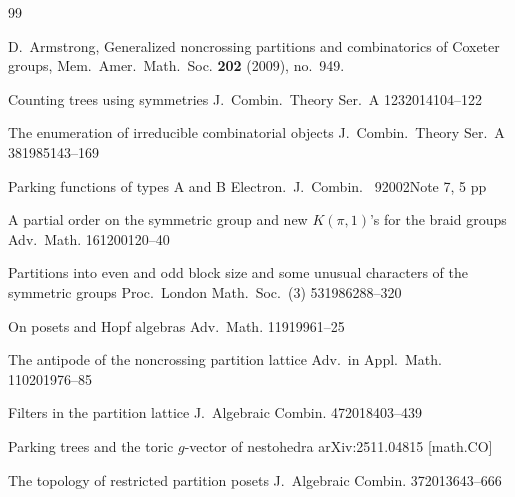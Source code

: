 \documentclass[11pt]{amsart}
\numberwithin{equation}{section}
\begin{document}
\begin{thebibliography}{99}

{\sc D.\ Armstrong,}
{Generalized noncrossing partitions and combinatorics of Coxeter groups,}
Mem.\ Amer.\ Math.\ Soc.
{\bf 202} (2009), no.\ 949.

            {Counting trees using symmetries}
            {J.\ Combin.\ Theory Ser.\ A}
            {123}{2014}{104--122}
            
            {The enumeration of irreducible combinatorial objects}
            {J.\ Combin.\ Theory Ser.\ A}
            {38}{1985}{143--169}

            {Parking functions of types A and B}
            {Electron.\ J.\ Combin.\ }
            {9}{2002}{Note 7, 5 pp}

            {A partial order on the symmetric group and new $K(\pi,1)$'s for the braid groups}
            {Adv.\ Math.}
            {161}{2001}{20--40}

        {Partitions into even and odd block size and
         some unusual characters of the symmetric groups}
        {Proc.\ London Math.\ Soc.\ (3)}
        {53}{1986}{288--320}

            {On posets and Hopf algebras}
            {Adv.\ Math.}
            {119}{1996}{1--25}

            {The antipode of the noncrossing partition lattice}
            {Adv.\ in Appl.\ Math.}
            {110}{2019}{76--85}

           {Filters in the partition lattice}
           {J.\ Algebraic Combin.}
           {47}{2018}{403--439}

      {Parking trees and the toric $g$-vector of nestohedra} 
      {arXiv:2511.04815 [math.CO]}

           {The topology of restricted partition posets}
           {J.\ Algebraic Combin.}
           {37}{2013}{643--666}
            

\end{thebibliography}
\end{document}
